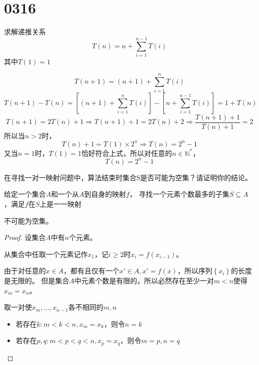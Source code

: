 \section{0316}
\begin{questions}


    \question 求解递推关系$$T(n) = n + \sum_{i=1}^{n-1}{T(i)}$$其中$T(1)=1$
    \begin{solution}
        $$
            T(n+1) = (n+1) + \sum_{i=1}^{n}{T(i)}
        $$
        $$
            T(n+1) - T(n)  = \left[(n+1) + \sum_{i=1}^{n}{T(i)}\right] - \left[n + \sum_{i=1}^{n-1}{T(i)}\right]
            = 1 + T(n)
        $$
        $$
            T(n+1) = 2T(n) + 1 \Rightarrow
            T(n+1) + 1 = 2T(n) + 2 \Rightarrow
            \frac{T(n+1) + 1}{T(n) + 1} = 2
        $$
        所以当$n>2$时，
        $$
            T(n) + 1 = T(1) \times 2^n \Rightarrow
            T(n) = 2^n - 1
        $$
        又当$n=1$时，$T(1) = 1$恰好符合上式，所以对任意的$n \in \mathbb{N}^*$，
        $$
            T(n) = 2^n - 1
        $$
    \end{solution}



    \question 在寻找一对一映射问题中，算法结束时集合S是否可能为空集？请证明你的结论。

    {\kaishu
    给定一个集合$A$和一个从$A$到自身的映射$f$，
    寻找一个元素个数最多的子集$S \subseteq A$，满足$f$在$S$上是一一映射
    }

    \begin{solution}
        不可能为空集。

        \begin{proof}
            设集合$A$中有$n$个元素。

            从集合中任取一个元素记作$x_1$，记$i \geq 2$时$x_{i} = f(x_{i-1})$。

            由于对任意的$x \in A$，都有且仅有一个$x' \in A, x' = f(x)$，所以序列$\left\{x_i\right\}$的长度是无限的。
            但是集合$A$中元素个数是有限的，所以必然存在至少一对$m < n$使得$x_m = x_n$。

            取一对使$x_m, \dots, x_{n-1}$各不相同的$m,n$
            \begin{itemize}
                \item 若存在$k:m < k < n , x_m = x_k$，则令$n = k$
                \item 若存在$p,q:m < p < q < n , x_p = x_q$，则令$m = p, n = q$
            \end{itemize}


\end{proof}
\end{solution}
\end{questions}
